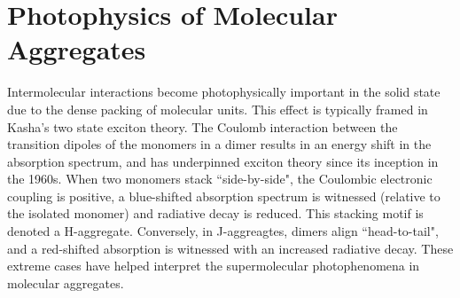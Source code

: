 \section{Photophysics of Molecular Aggregates}\label{section: lom intermolecular-interactions}
Intermolecular interactions become photophysically important in the solid state due to the dense packing of molecular units. This effect is typically framed in Kasha's two state exciton theory.\cite{Gierschner2009,Gierschner2013,Gierschner2013a,Hestand2017,Shi2017} The Coulomb interaction between the transition dipoles of the monomers in a dimer results in an energy shift in the absorption spectrum, and has underpinned exciton theory since its inception in the 1960s.\cite{Kasha1965a} When two monomers stack ``side-by-side", the Coulombic electronic coupling is positive, a blue-shifted absorption spectrum is witnessed (relative to the isolated monomer) and radiative decay is reduced. This stacking motif is denoted a H-aggregate. Conversely, in J-aggreagtes, dimers align ``head-to-tail", and a red-shifted absorption is witnessed with an increased radiative decay. These extreme cases have helped interpret the supermolecular photophenomena in molecular aggregates.

